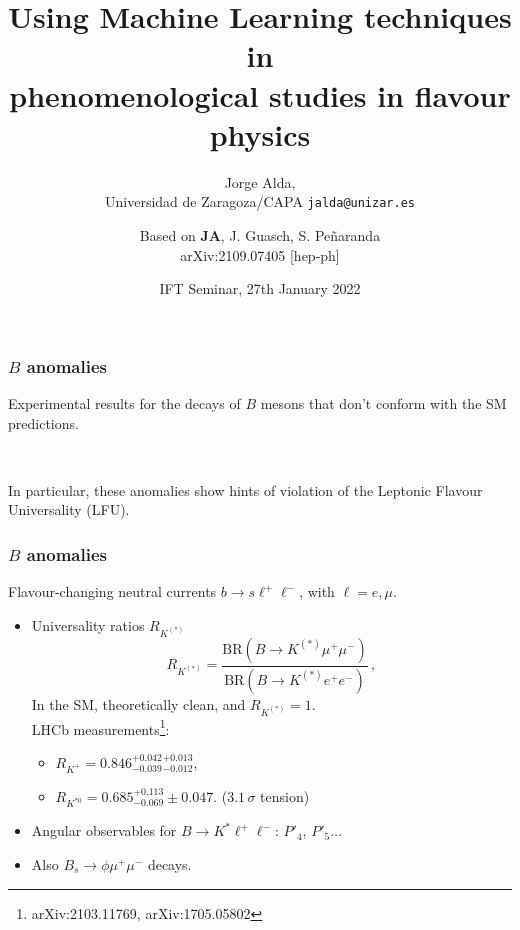 \documentclass[mathserif, 10pt]{beamer}
\title[Using ML techniques in phenomenological studies in flavour physics]{Using Machine Learning techniques in\\ phenomenological studies in flavour physics}
\subtitle{Jorge Alda,\\ Universidad de Zaragoza/CAPA \hspace{4em} \texttt{jalda@unizar.es} }
\author[Jorge Alda]{Based on \textbf{JA}, J. Guasch, S. Peñaranda \\
arXiv:2109.07405 [hep-ph]}
\date[IFT Seminar]{IFT Seminar, 27th January 2022}
\begin{document}
\begin{frame}
\titlepage
\end{frame}

\begin{frame}
    \frametitle{$B$ anomalies}

    Experimental results for the decays of $B$ mesons that don't conform with the SM predictions.

    ~

    In particular, these anomalies show hints of violation of the Leptonic Flavour Universality (LFU).

\end{frame}

\begin{frame}
    \frametitle{$B$ anomalies}

    Flavour-changing neutral currents $b \to s \ell^+ \ell^-$, with $\ell = e, \mu$.
    \begin{itemize}
        \item Universality ratios $R_{K^{(*)}}$
              $$R_{K^{(*)}} = \frac{\mathrm{BR}(B\to K^{(*)}\mu^+ \mu^-)}{\mathrm{BR}(B\to K^{(*)}e^+ e^-)}\,, $$
              In the SM, theoretically clean, and $R_{K^{(*)}}=1$.\\
              LHCb measurements\footnote{arXiv:2103.11769, arXiv:1705.05802}:
              \begin{itemize}
                  \item $R_{K^+} = 0.846^{+0.042}_{-0.039}{}^{+0.013}_{-0.012}$,
                  \item $R_{K^{*0}} = 0.685^{+0.113}_{-0.069}\pm0.047$. ($3.1\,\sigma$ tension)
              \end{itemize}
        \item Angular observables for $B\to K^* \ell^+\ell^-$: $P'_4$, $P'_5\ldots$
        \item Also $B_s \to \phi \mu^+ \mu^-$ decays.
    \end{itemize}

\end{frame}
\end{document}
